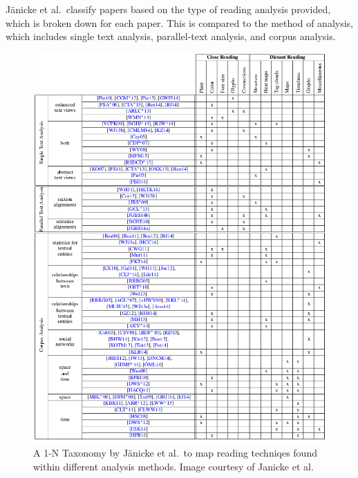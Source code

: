 J{\"a}nicke et al.\ classify papers based on the type of reading analysis provided, which is broken down for each paper. This is compared to the method of analysis, which includes single text analysis, parallel-text analysis, and corpus analysis.

\begin{figure}[p]
\begin{center}
\includegraphics[width=1\textwidth]{images/janicke2015on}
\caption{A 1-N Taxonomy by J{\"a}nicke et al.\ to map reading techniqes found within different analysis methods. Image courtesy of Janicke et al.\ \cite{janicke2015on}} \label{fig: janicke2015on}
\vspace{-0.3cm}
\end{center}
\end{figure}

